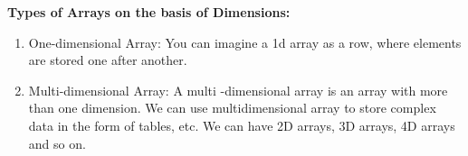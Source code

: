 \textbf{Types of Arrays on the basis of Dimensions:}
\begin{enumerate}
    \item One-dimensional Array: You can imagine a 1d array as a row,
        where elements are stored one after another.
    \item Multi-dimensional Array: A multi -dimensional array is an
        array with more than one dimension. We can use multidimensional
        array to store complex data in the form of tables, etc. We can
        have 2D arrays, 3D arrays, 4D arrays and so on.
\end{enumerate}
